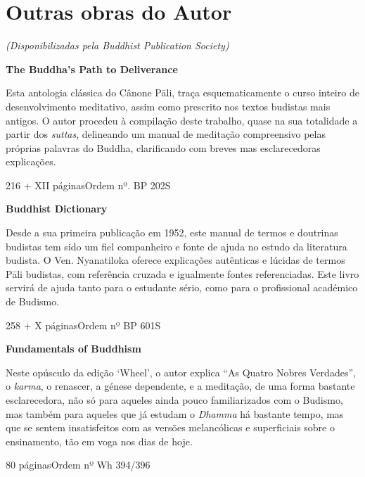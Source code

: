 \chapter{Outras obras do Autor}

{\centering
  \emph{(Disponibilizadas pela Buddhist Publication Society)}
\par}

\bigskip

\textbf{The Buddha's Path to Deliverance}

Esta antologia clássica do Cânone Pāli, traça esquematicamente o curso inteiro de desenvolvimento meditativo, assim como prescrito nos textos budistas mais antigos. O autor procedeu à compilação deste trabalho, quase na sua totalidade a partir dos \emph{suttas}, delineando um manual de meditação compreensivo pelas próprias palavras do Buddha, clarificando com breves mas esclarecedoras explicações.

216 + XII páginas\hfill Ordem nº. BP 202S

\bigskip

\textbf{Buddhist Dictionary}

Desde a sua primeira publicação em 1952, este manual de termos e doutrinas
budistas tem sido um fiel companheiro e fonte de ajuda no estudo da literatura
budista. O Ven. Nyanatiloka oferece explicações autênticas e lúcidas de termos
Pāli budistas, com referência cruzada e igualmente fontes referenciadas. Este
livro servirá de ajuda tanto para o estudante sério, como para o profissional
académico de Budismo.

258 + X páginas\hfill Ordem nº BP 601S

\clearpage

\textbf{Fundamentals of Buddhism}

Neste opúsculo da edição `Wheel', o autor explica ``As Quatro Nobres Verdades'',
o \emph{karma}, o renascer, a génese dependente, e a meditação, de uma forma
bastante esclarecedora, não só para aqueles ainda pouco familiarizados com o
Budismo, mas também para aqueles que já estudam o \emph{Dhamma} há bastante
tempo, mas que se sentem insatisfeitos com as versões melancólicas e
superficiais sobre o ensinamento, tão em voga nos dias de hoje.

80 páginas\hfill Ordem nº Wh 394/396

